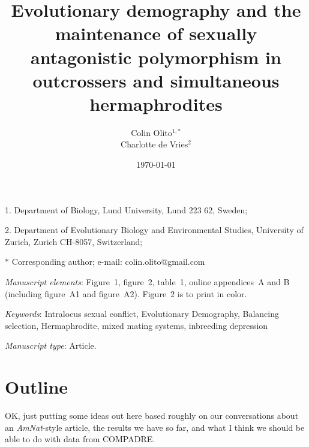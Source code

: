 \documentclass[11pt]{article}
\begin{document}
\title{Evolutionary demography and the maintenance of sexually antagonistic polymorphism in outcrossers and simultaneous hermaphrodites}
\author{Colin Olito$^{1,\ast}$ \\ 
Charlotte de Vries$^{2}$}
\date{\today}
\maketitle

\noindent{} 1. Department of Biology, Lund University, Lund 223 62, Sweden;

\noindent{} 2.  Department of Evolutionary Biology and Environmental Studies, University of Zurich, Zurich CH-8057, Switzerland;

\noindent{} $\ast$ Corresponding author; e-mail: colin.olito@gmail.com

\bigskip

\textit{Manuscript elements}: Figure~1, figure~2, table~1, online appendices~A and B (including figure~A1 and figure~A2). Figure~2 is to print in color.

\bigskip

\textit{Keywords}: Intralocus sexual conflict, Evolutionary Demography, Balancing selection, Hermaphrodite, mixed mating systems, inbreeding depression 

\bigskip

\textit{Manuscript type}: Article. %

\bigskip


\linenumbers{}
\modulolinenumbers[3]

\newpage{}



\section*{Outline}

OK, just putting some ideas out here based roughly on our conversations about an {\itshape AmNat}-style article, the results we have so far, and what I think we should be able to do with data from COMPADRE. 
\end{document}

